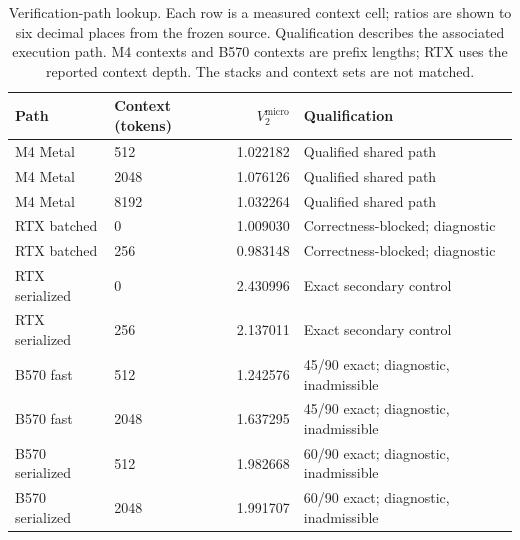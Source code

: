 \begin{table}[t]
\caption{Verification-path lookup. Each row is a measured context cell; ratios are shown to six decimal places from the frozen source. Qualification describes the associated execution path. M4 contexts and B570 contexts are prefix lengths; RTX uses the reported context depth. The stacks and context sets are not matched.}
\label{tab:verificationlookup}
\centering
\begin{tabular}{llrl}
\toprule
Path & Context (tokens) & $V_2^{\mathrm{micro}}$ & Qualification \\
\midrule
M4 Metal & 512 & 1.022182 & Qualified shared path \\
M4 Metal & 2048 & 1.076126 & Qualified shared path \\
M4 Metal & 8192 & 1.032264 & Qualified shared path \\
RTX batched & 0 & 1.009030 & Correctness-blocked; diagnostic \\
RTX batched & 256 & 0.983148 & Correctness-blocked; diagnostic \\
RTX serialized & 0 & 2.430996 & Exact secondary control \\
RTX serialized & 256 & 2.137011 & Exact secondary control \\
B570 fast & 512 & 1.242576 & 45/90 exact; diagnostic, inadmissible \\
B570 fast & 2048 & 1.637295 & 45/90 exact; diagnostic, inadmissible \\
B570 serialized & 512 & 1.982668 & 60/90 exact; diagnostic, inadmissible \\
B570 serialized & 2048 & 1.991707 & 60/90 exact; diagnostic, inadmissible \\
\bottomrule
\end{tabular}
\end{table}
